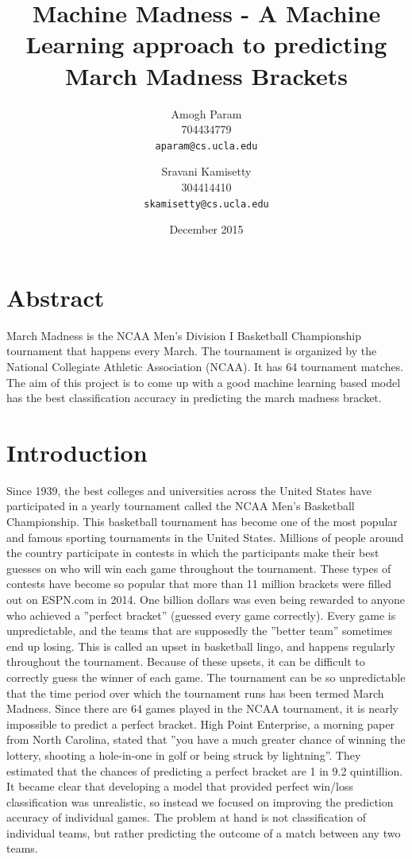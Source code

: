 \documentclass{article}
\title{Machine Madness - A Machine Learning approach to predicting March Madness Brackets}
\author{
  Amogh Param\\
  704434779\\
  \texttt{aparam@cs.ucla.edu}
  \and
  Sravani Kamisetty\\
  304414410\\
  \texttt{skamisetty@cs.ucla.edu}
}
\date{December 2015}
\begin{document}
    \maketitle
    
    \begin{multicols}{2}
    \section*{Abstract}  
	March Madness is the NCAA Men’s Division I Basketball Championship tournament that happens every March. The tournament is organized by the National Collegiate Athletic Association (NCAA). It has 64 tournament matches. The aim of this project is to come up with a good machine learning based model has the best classification accuracy in predicting the march madness bracket.
   
    \section{Introduction}
    Since 1939, the best colleges and universities across the United States have participated in a yearly tournament called the NCAA Men’s Basketball Championship. This basketball tournament has become one of the most popular and famous sporting tournaments in the United States. Millions of people around the country participate in contests in which the participants make their best guesses on who will win each game throughout the tournament. These types of contests have become so popular that more than 11 million brackets were filled out on ESPN.com in 2014. One billion dollars was even being rewarded to anyone who achieved a ”perfect bracket” (guessed every game correctly). Every game is unpredictable, and the teams that are supposedly the ”better team” sometimes end up losing. This is called an upset in basketball lingo, and happens regularly throughout the tournament. Because of these upsets, it can be difficult to correctly guess the winner of each game. The tournament can be so unpredictable that the time period over which the tournament runs has been termed March Madness. Since there are 64 games played in the NCAA tournament, it is nearly impossible to predict a perfect bracket. High Point Enterprise, a morning paper from North Carolina, stated that ”you have a much greater chance of winning the lottery, shooting a hole-in-one in golf or being struck by lightning”. They estimated that the chances of predicting a perfect bracket are 1 in 9.2 quintillion. It became clear that developing a model that provided perfect win/loss classification was unrealistic, so instead we focused on improving the prediction accuracy of individual games. The problem at hand is not classification of individual teams, but rather predicting the outcome of a match between any two teams. 
    

\end{multicols}
\end{document}
